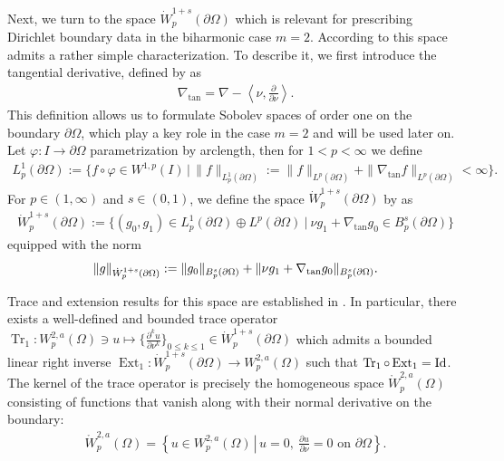 \documentclass[12pt,a4paper,twoside]{article}
\begin{document}
Next, we turn to the space $\dot W_p^{1+s}(\partial\Omega)$ which is relevant for prescribing Dirichlet boundary data in the biharmonic case $m=2$. 
According to \cite[Corollary 7.11]{maz2010dirichlet}  this space admits a rather simple characterization. To describe it, we first introduce the tangential derivative, defined by \cite[Subsection 7.2]{maz2010dirichlet} as
\begin{align}
    \nabla_\text{tan}=  \nabla - \left\langle \nu, \frac{\partial}{\partial\nu}\right\rangle. \label{eq:tanggrad}
\end{align}
This definition allows us to formulate Sobolev spaces of order one on the boundary  $\partial \Omega$, which play a key role in the case $m=2$ and will be used later on. Let $\varphi\colon I\to \partial\Omega$ parametrization by arclength, then for $1<p<\infty$ we define 
\begin{align*}
    L^1_p(\partial\Omega):= \big\{ f\circ \varphi \in W^{1,p}(I) \, \big| \, \|f\|_{L^1_p(\partial\Omega)}:=\| f\|_{L^p(\partial\Omega)}+ \| \nabla_\text{tan} f \|_{L^p(\partial\Omega)}<\infty \big\}.
\end{align*}
For $p\in(1,\infty)$ and $s\in (0,1)$,   we define the space $\dot{W}^{1+s}_p(\partial\Omega)$ by \cite[p. 232 Corollary 7.11]{maz2010dirichlet} as
\begin{align}
    \dot{W}^{1+s}_p(\partial\Omega) := \big\{ (g_0,g_1) \in L^1_p(\partial \Omega) \oplus  L^p(\partial\Omega)\ \big| \ \nu g_1 + \nabla_\text{tan} g_0 \in B^s_p(\partial\Omega) \big\} \label{eq:dirichspace}
\end{align} 
equipped with the norm
\begin{align*}
    \|g\|_{\dot W^{1+s}_p(\partial\Omega)}:= \|g_0\|_{B^s_p(\partial\Omega)}
    +\|\nu g_1 + \nabla_{\rm tan} g_0\|_{B^s_p(\partial\Omega)}.
\end{align*}


Trace and extension results for this space are established in \cite[p. 223, Theorem 7.8]{maz2010dirichlet}. In particular, there exists a well-defined and bounded trace operator $  \operatorname{Tr}_{1}: W^{2,a}_p(\Omega) \ni u \mapsto \big\{ \frac{\partial^k u}{\partial \nu^k} \big\} _  {0\le k\le 1 }\in\dot W^{1+s}_p(\partial\Omega) $ which admits a bounded linear right inverse $  \operatorname{Ext}_{1}: \dot W^{1+s}_p(\partial\Omega)    \to W^{2,a}_p(\Omega) $ such that $\operatorname{Tr}_{1}\circ\operatorname{Ext}_{1}= {\rm Id}$. The kernel of the trace operator is precisely the homogeneous space $\mathring W^{2,a}_p(\Omega)$ consisting of functions that vanish along with their normal derivative on the boundary:
\begin{align}
  \mathring W^{2,a}_p(\Omega)=\left\{  u\in W^{2,a}_p(\Omega)\, \left| \, u=0,\ \frac{\partial u}{\partial \nu} = 0 \text{ on } \partial\Omega \right\} \right. . \label{eq:rindwbound}
\end{align}
\end{document}
